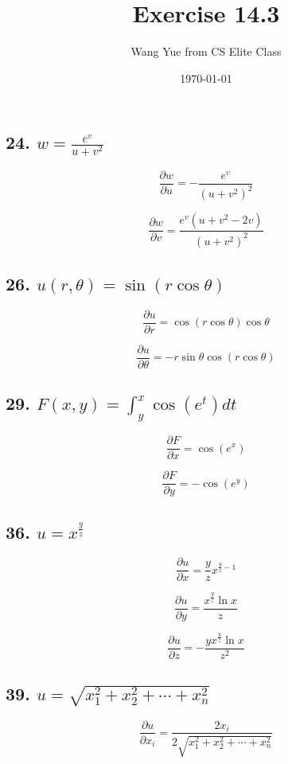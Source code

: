 \documentclass{article}
\begin{document}
    \title{Exercise 14.3}
    \author{Wang Yue from CS Elite Class}
    \date{\today}
    \maketitle

    \subsection*{24. $w = \frac{e^v}{u + v^2}$}

    $$\frac{\partial w}{\partial u} = -\frac{e^v}{(u + v^2)^2}$$

    $$\frac{\partial w}{\partial v} = \frac{e^v(u + v^2 - 2v)}{(u + v^2)^2}$$

    \subsection*{26. $u(r, \theta) = \sin (r\cos \theta)$}

    $$\frac{\partial u}{\partial r} = \cos (r\cos \theta) \cos \theta$$

    $$\frac{\partial u}{\partial \theta} = -r\sin \theta \cos (r\cos \theta)$$

    \subsection*{29. $F(x, y) = \int_y^x \cos(e^t) dt$}

    $$\frac{\partial F}{\partial x} = \cos (e^x)$$

    $$\frac{\partial F}{\partial y} = -\cos (e^y)$$

    \subsection*{36. $u = x^{\frac y z}$}

    $$\frac{\partial u}{\partial x} = \frac y z x^{\frac y z - 1}$$

    $$\frac{\partial u}{\partial y} = \frac{x^{\frac y z} \ln x}{z}$$

    $$\frac{\partial u}{\partial z} = -\frac{y x^{\frac y z} \ln x}{z^2}$$

    \subsection*{39. $u = \sqrt{x_1^2 + x_2^2 + \cdots + x_n^2}$}

    $$\frac{\partial u}{\partial x_i} = \frac{2x_i}{2\sqrt{x_1^2 + x_2^2 + \cdots + x_n^2}}$$
\end{document}
